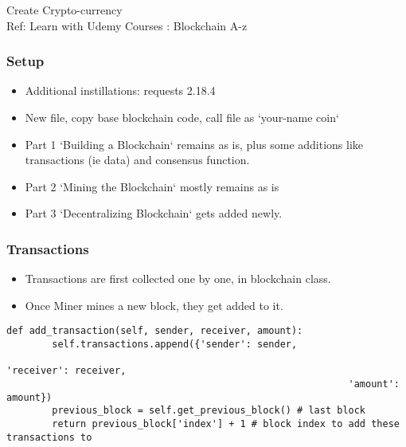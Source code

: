 \begin{frame}[fragile]\frametitle{}
\begin{center}
{\Large Create Crypto-currency}\\
{\small Ref: Learn with Udemy Courses : Blockchain A-z}
\end{center}
\end{frame}

\begin{frame}[fragile]\frametitle{Setup}
\begin{itemize}
\item Additional instillations: requests 2.18.4
\item New file, copy base blockchain code, call file as `your-name coin`
\item Part 1 `Building a Blockchain` remains as is, plus some additions like transactions (ie data) and consensus function.
\item Part 2 `Mining the Blockchain` mostly remains as is
\item Part 3 `Decentralizing Blockchain` gets added newly.
\end{itemize}
\end{frame}

\begin{frame}[fragile]\frametitle{Transactions}
\begin{itemize}
\item Transactions are first collected one by one, in blockchain class.
\item Once Miner mines a new block, they get added to it.
\end{itemize}

\begin{lstlisting}
def add_transaction(self, sender, receiver, amount):
		self.transactions.append({'sender': sender,
															'receiver': receiver,
															'amount': amount})
		previous_block = self.get_previous_block() # last block
		return previous_block['index'] + 1 # block index to add these transactions to

\end{lstlisting}
\end{frame}

